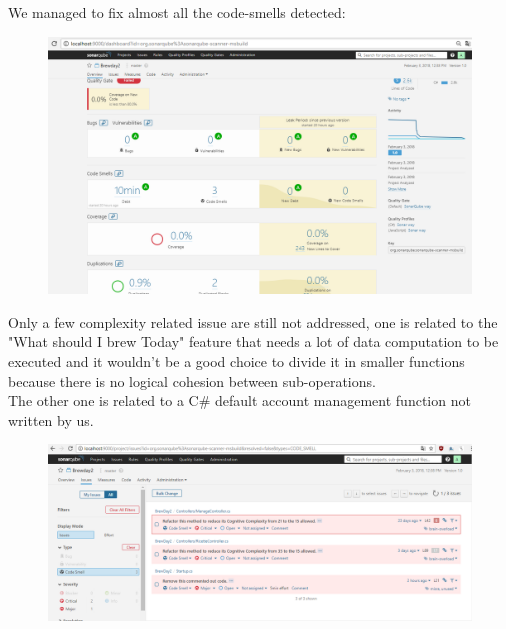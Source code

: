 \documentclass[12pt]{article}
\begin{document}
\pagebreak
We managed to fix almost all the code-smells detected:
\begin{figure}[H]
\includegraphics[scale=0.5]{sonar4.png}
\end{figure}
\pagebreak
Only a few complexity related issue are still not addressed, one is related to the "What should I brew Today" feature that needs a lot of data computation to be executed and it wouldn't be a good choice to divide it in smaller functions because
there is no logical cohesion between sub-operations.\\
The other one is related to a C\# default account management function not written by us.
\begin{figure}[H]
\includegraphics[scale=0.5]{code-smell.png}
\end{figure}
\end{document}
